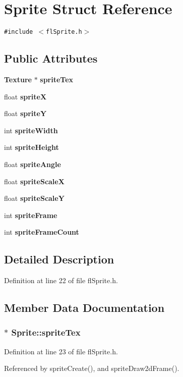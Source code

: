 \section{Sprite Struct Reference}
\label{structSprite}
{\tt \#include $<$fl\-Sprite.h$>$}

\subsection*{Public Attributes}
\begin{CompactItemize}
\item 
{\bf Texture} $\ast$ {\bf sprite\-Tex}
\item 
float {\bf sprite\-X}
\item 
float {\bf sprite\-Y}
\item 
int {\bf sprite\-Width}
\item 
int {\bf sprite\-Height}
\item 
float {\bf sprite\-Angle}
\item 
float {\bf sprite\-Scale\-X}
\item 
float {\bf sprite\-Scale\-Y}
\item 
int {\bf sprite\-Frame}
\item 
int {\bf sprite\-Frame\-Count}
\end{CompactItemize}


\subsection{Detailed Description}




Definition at line 22 of file fl\-Sprite.h.

\subsection{Member Data Documentation}
\subsubsection{$\ast$ {\bf Sprite::sprite\-Tex}}\label{structSprite_f048223fd9b90a5d6db481d388629888}




Definition at line 23 of file fl\-Sprite.h.

Referenced by sprite\-Create(), and sprite\-Draw2d\-Frame().
